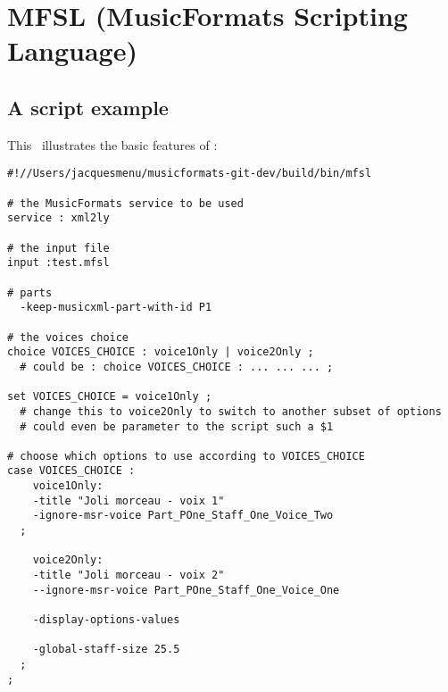 



\chapter{MFSL (MusicFormats Scripting Language)}

\section{A script example}

This \script\ illustrates the basic features of \mfslLang:
\begin{lstlisting}[language=MFSL]
#!//Users/jacquesmenu/musicformats-git-dev/build/bin/mfsl

# the MusicFormats service to be used
service : xml2ly

# the input file
input :test.mfsl

# parts
  -keep-musicxml-part-with-id P1

# the voices choice
choice VOICES_CHOICE : voice1Only | voice2Only ;
  # could be : choice VOICES_CHOICE : ... ... ... ;

set VOICES_CHOICE = voice1Only ;
  # change this to voice2Only to switch to another subset of options
  # could even be parameter to the script such a $1

# choose which options to use according to VOICES_CHOICE
case VOICES_CHOICE :
	voice1Only:
    -title "Joli morceau - voix 1"
    -ignore-msr-voice Part_POne_Staff_One_Voice_Two
  ;

	voice2Only:
    -title "Joli morceau - voix 2"
    --ignore-msr-voice Part_POne_Staff_One_Voice_One

    -display-options-values

    -global-staff-size 25.5
  ;
;
\end{lstlisting}

